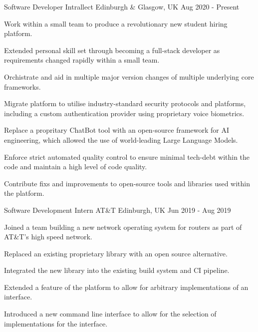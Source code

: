

\begin{cventries}

    \cventry
    {Software Developer}
    {Intrallect}
    {Edinburgh \& Glasgow, UK}
    {Aug 2020 - Present}
    {
        \begin{cvitems}
            \item {Work within a small team to produce a revolutionary new student hiring platform.}
            \item {Extended personal skill set through becoming a full-stack developer as requirements changed rapidly within a small team.}
            \item {Orchistrate and aid in multiple major version changes of multiple underlying core frameworks.}
            \item {Migrate platform to utilise industry-standard security protocols and platforms, including a custom authentication provider using proprietary voice biometrics.}
            \item {Replace a propritary ChatBot tool with an open-source framework for AI engineering, which allowed the use of world-leading Large Language Models.}
            \item {Enforce strict automated quality control to ensure minimal tech-debt within the code and maintain a high level of code quality.}
            \item {Contribute fixs and improvements to open-source tools and libraries used within the platform.}
        \end{cvitems}
    }

    \cventry
    {Software Development Intern}
    {AT\&T}
    {Edinburgh, UK}
    {Jun 2019 - Aug 2019}
    {
        \begin{cvitems}
            \item {Joined a team building a new network operating system for routers as part of AT\&T's high speed network.}
            \item {Replaced an existing proprietary library with an open source alternative.}
            \item {Integrated the new library into the existing build system and CI pipeline.}
            \item {Extended a feature of the platform to allow for arbitrary implementations of an interface.}
            \item {Introduced a new command line interface to allow for the selection of implementations for the interface.}
        \end{cvitems}
    }


\end{cventries}
